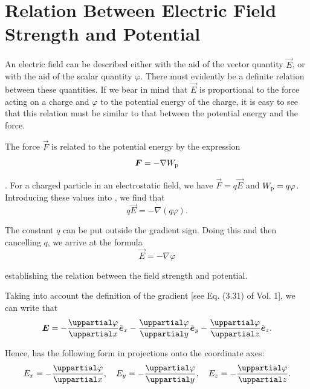 \section{Relation Between Electric Field Strength and Potential}\label{sec:1_8}

An electric field can be described either with the aid of the vector quantity $\vec{E}$, or with the aid of the scalar quantity $\varphi$. There must evidently be a definite relation between these quantities. If we bear in mind that $\vec{E}$ is proportional to the force acting on a charge and $\varphi$ to the potential energy of the charge, it is easy to see that this relation must be similar to that between the potential energy and the force.

The force $\vec{F}$ is related to the potential energy by the expression
\begin{equation}\label{eq:1_40}
	\boldsymbol{F} = -\nabla W_{\text{p}}
\end{equation}

. For a charged particle in an electrostatic field, we have $\vec{F}=q\vec{E}$ and $W_{\text{p}}=q\varphi$. Introducing these values into , we find that
\begin{equation*}
	q \vec{E} = -\nabla(q\varphi).
\end{equation*}

\noindent
The constant $q$ can be put outside the gradient sign. Doing this and then cancelling $q$, we arrive at the formula
\begin{equation}\label{eq:1_41}
	\vec{E} = -\nabla\varphi
\end{equation}

\noindent
establishing the relation between the field strength and potential.

Taking into account the definition of the gradient [see Eq. (3.31) of Vol. 1], we can write that
\begin{equation}\label{eq:1_42}
	\vec{E} = -\diffpartial{\varphi}{x}\vecuni{x} -\diffpartial{\varphi}{y}\vecuni{y} -\diffpartial{\varphi}{z}\vecuni{z}.
\end{equation}

\noindent
Hence,  has the following form in projections onto the coordinate axes:
\begin{equation}\label{eq:1_43}
	E_x = -\diffpartial{\varphi}{x},\quad E_y = -\diffpartial{\varphi}{y},\quad E_z = -\diffpartial{\varphi}{z}.
\end{equation}

